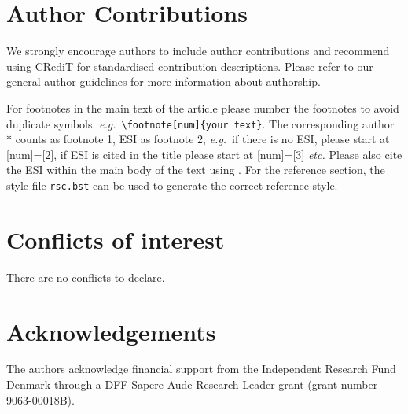 \documentclass[twoside,twocolumn,9pt]{article}
\renewcommand{\refname}{Notes and references}
\begin{document}
\section*{Author Contributions}
We strongly encourage authors to include author contributions and recommend using \href{https://casrai.org/credit/}{CRediT} for standardised contribution descriptions. Please refer to our general \href{https://www.rsc.org/journals-books-databases/journal-authors-reviewers/author-responsibilities/}{author guidelines} for more information about authorship.

For footnotes in the main text of the article please number the footnotes to avoid duplicate symbols. \textit{e.g.}\ \texttt{\textbackslash footnote[num]\{your text\}}. The corresponding author $\ast$ counts as footnote 1, ESI as footnote 2, \textit{e.g.}\ if there is no ESI, please start at [num]=[2], if ESI is cited in the title please start at [num]=[3] \textit{etc.} Please also cite the ESI within the main body of the text using \dag. For the reference section, the style file \texttt{rsc.bst} can be used to generate the correct reference style.

\section*{Conflicts of interest}
There are no conflicts to declare.

\section*{Acknowledgements}
The authors acknowledge financial support from the Independent Research Fund Denmark through a DFF Sapere Aude Research Leader grant (grant number 9063-00018B).





\balance


\end{document}
